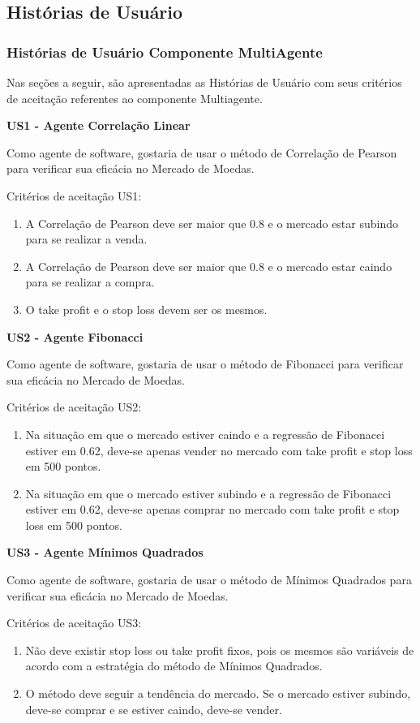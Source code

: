 \subsection{Histórias de Usuário}

\subsubsection{Histórias de Usuário Componente MultiAgente}
Nas seções a seguir, são apresentadas as Histórias de Usuário com seus critérios de aceitação referentes ao componente Multiagente.

\textbf{ US1 - Agente Correlação Linear}

Como agente de software, gostaria de usar o método de Correlação de Pearson para verificar sua eficácia no Mercado de Moedas.

Critérios de aceitação US1:
\begin{enumerate}
\item A Correlação de Pearson deve ser maior que 0.8 e o mercado estar subindo para se realizar a venda.
\item A Correlação de Pearson deve ser maior que 0.8 e o mercado estar caindo para se realizar a compra.
\item O take profit e o stop loss devem ser os mesmos.
\end{enumerate}

\textbf{US2 - Agente Fibonacci}

Como agente de software, gostaria de usar o método de Fibonacci para verificar sua eficácia no Mercado de Moedas.

Critérios de aceitação US2:
\begin{enumerate}
\item Na situação em que o mercado estiver caindo e a regressão de Fibonacci estiver em 0.62, deve-se apenas vender no mercado com take profit e stop loss em 500 pontos.
\item Na situação em que o mercado estiver subindo e a regressão de Fibonacci estiver em 0.62, deve-se apenas comprar no mercado com take profit e stop loss em 500 pontos.
\end{enumerate}

\textbf{US3 - Agente Mínimos Quadrados}

Como agente de software, gostaria de usar o método de Mínimos Quadrados para verificar sua eficácia no Mercado de Moedas.

Critérios de aceitação US3:
\begin{enumerate}
\item Não deve existir stop loss ou take profit fixos, pois os mesmos são variáveis de acordo com a estratégia do método de Mínimos Quadrados.
\item O método deve seguir a tendência do mercado. Se o mercado estiver subindo, deve-se comprar e se estiver caindo, deve-se vender.
\end{enumerate}


